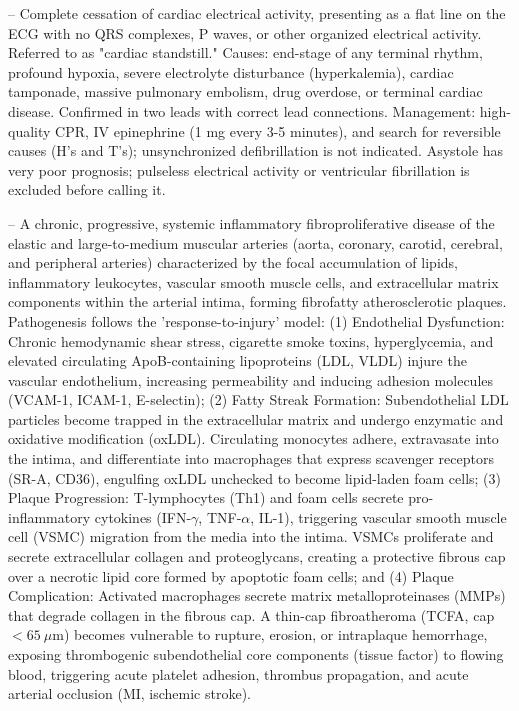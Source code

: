 -- Complete cessation of cardiac electrical activity, presenting as a flat line on the ECG with no QRS complexes, P waves, or other organized electrical activity. Referred to as "cardiac standstill." Causes: end-stage of any terminal rhythm, profound hypoxia, severe electrolyte disturbance (hyperkalemia), cardiac tamponade, massive pulmonary embolism, drug overdose, or terminal cardiac disease. Confirmed in two leads with correct lead connections. Management: high-quality CPR, IV epinephrine (1 mg every 3-5 minutes), and search for reversible causes (H's and T's); unsynchronized defibrillation is not indicated. Asystole has very poor prognosis; pulseless electrical activity or ventricular fibrillation is excluded before calling it.

-- A chronic, progressive, systemic inflammatory fibroproliferative disease of the elastic and large-to-medium muscular arteries (aorta, coronary, carotid, cerebral, and peripheral arteries) characterized by the focal accumulation of lipids, inflammatory leukocytes, vascular smooth muscle cells, and extracellular matrix components within the arterial intima, forming fibrofatty atherosclerotic plaques. Pathogenesis follows the 'response-to-injury' model: (1) Endothelial Dysfunction: Chronic hemodynamic shear stress, cigarette smoke toxins, hyperglycemia, and elevated circulating ApoB-containing lipoproteins (LDL, VLDL) injure the vascular endothelium, increasing permeability and inducing adhesion molecules (VCAM-1, ICAM-1, E-selectin); (2) Fatty Streak Formation: Subendothelial LDL particles become trapped in the extracellular matrix and undergo enzymatic and oxidative modification (oxLDL). Circulating monocytes adhere, extravasate into the intima, and differentiate into macrophages that express scavenger receptors (SR-A, CD36), engulfing oxLDL unchecked to become lipid-laden foam cells; (3) Plaque Progression: T-lymphocytes (Th1) and foam cells secrete pro-inflammatory cytokines (IFN-$\gamma$, TNF-$\alpha$, IL-1), triggering vascular smooth muscle cell (VSMC) migration from the media into the intima. VSMCs proliferate and secrete extracellular collagen and proteoglycans, creating a protective fibrous cap over a necrotic lipid core formed by apoptotic foam cells; and (4) Plaque Complication: Activated macrophages secrete matrix metalloproteinases (MMPs) that degrade collagen in the fibrous cap. A thin-cap fibroatheroma (TCFA, cap $<65 \ \mu\text{m}$) becomes vulnerable to rupture, erosion, or intraplaque hemorrhage, exposing thrombogenic subendothelial core components (tissue factor) to flowing blood, triggering acute platelet adhesion, thrombus propagation, and acute arterial occlusion (MI, ischemic stroke).

